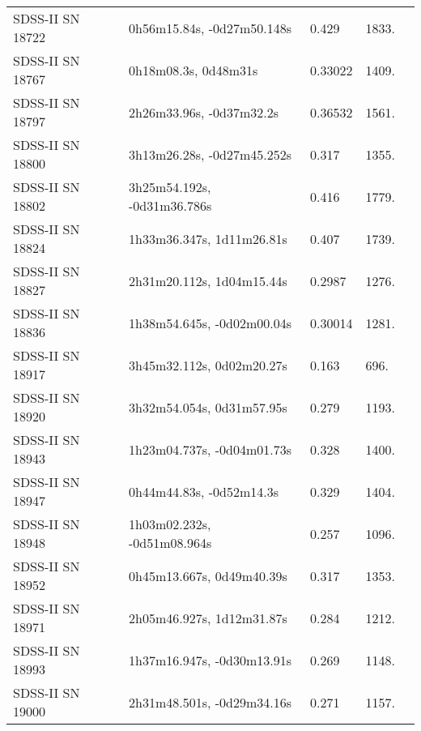 \begin{longtable}{lllll}
 SDSS-II SN 18722 &     0h56m15.84s, -0d27m50.148s &    0.429 &          1833. &    \citet{2011ApJ...738..162S} \\
 SDSS-II SN 18767 &           0h18m08.3s, 0d48m31s &  0.33022 &          1409. &    \citet{2016SDSSD.C...0000:} \\
 SDSS-II SN 18797 &       2h26m33.96s, -0d37m32.2s &  0.36532 &          1561. &    \citet{2016SDSSD.C...0000:} \\
 SDSS-II SN 18800 &     3h13m26.28s, -0d27m45.252s &    0.317 &          1355. &    \citet{2011ApJ...738..162S} \\
 SDSS-II SN 18802 &    3h25m54.192s, -0d31m36.786s &    0.416 &          1779. &    \citet{2011ApJ...738..162S} \\
 SDSS-II SN 18824 &      1h33m36.347s, 1d11m26.81s &    0.407 &          1739. &    \citet{2011ApJ...738..162S} \\
 SDSS-II SN 18827 &      2h31m20.112s, 1d04m15.44s &   0.2987 &          1276. &    \citet{2016SDSSD.C...0000:} \\
 SDSS-II SN 18836 &     1h38m54.645s, -0d02m00.04s &  0.30014 &          1281. &    \citet{2016SDSSD.C...0000:} \\
 SDSS-II SN 18917 &      3h45m32.112s, 0d02m20.27s &    0.163 &           696. &    \citet{2011ApJ...738..162S} \\
 SDSS-II SN 18920 &      3h32m54.054s, 0d31m57.95s &    0.279 &          1193. &    \citet{2010ApJ...713.1026D} \\
 SDSS-II SN 18943 &     1h23m04.737s, -0d04m01.73s &    0.328 &          1400. &    \citet{2010ApJ...713.1026D} \\
 SDSS-II SN 18947 &       0h44m44.83s, -0d52m14.3s &    0.329 &          1404. &    \citet{2010ApJ...713.1026D} \\
 SDSS-II SN 18948 &    1h03m02.232s, -0d51m08.964s &    0.257 &          1096. &    \citet{2011ApJ...738..162S} \\
 SDSS-II SN 18952 &      0h45m13.667s, 0d49m40.39s &    0.317 &          1353. &    \citet{2011ApJ...738..162S} \\
 SDSS-II SN 18971 &      2h05m46.927s, 1d12m31.87s &    0.284 &          1212. &    \citet{2011ApJ...738..162S} \\
 SDSS-II SN 18993 &     1h37m16.947s, -0d30m13.91s &    0.269 &          1148. &    \citet{2011ApJ...738..162S} \\
 SDSS-II SN 19000 &     2h31m48.501s, -0d29m34.16s &    0.271 &          1157. &    \citet{2010ApJ...713.1026D} \\

\end{longtable}
